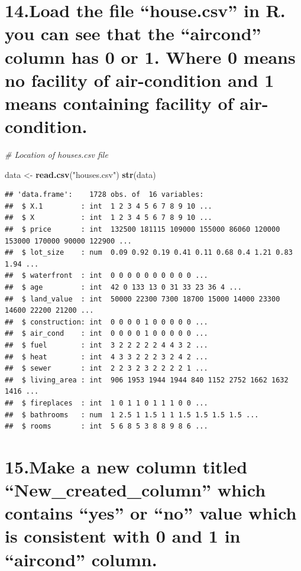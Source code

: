 \documentclass[]{article}
\newenvironment{Shaded}{\begin{snugshade}}{\end{snugshade}}
\newcommand{\CommentTok}[1]{\textcolor[rgb]{0.56,0.35,0.01}{\textit{#1}}}
\newcommand{\KeywordTok}[1]{\textcolor[rgb]{0.13,0.29,0.53}{\textbf{#1}}}
\newcommand{\NormalTok}[1]{#1}
\newcommand{\StringTok}[1]{\textcolor[rgb]{0.31,0.60,0.02}{#1}}
\begin{document}
\hypertarget{load-the-file-house.csv-in-r.-you-can-see-that-the-aircond-column-has-0-or-1.-where-0-means-no-facility-of-air-condition-and-1-means-containing-facility-of-air-condition.}{%
\section{14.Load the file ``house.csv'' in R. you can see that the
``aircond'' column has 0 or 1. Where 0 means no facility of
air-condition and 1 means containing facility of
air-condition.}\label{load-the-file-house.csv-in-r.-you-can-see-that-the-aircond-column-has-0-or-1.-where-0-means-no-facility-of-air-condition-and-1-means-containing-facility-of-air-condition.}}

\begin{Shaded}
\begin{Highlighting}[]
\CommentTok{# Location of houses.csv file}

\NormalTok{data <-}\StringTok{ }\KeywordTok{read.csv}\NormalTok{(}\StringTok{"houses.csv"}\NormalTok{)}
\KeywordTok{str}\NormalTok{(data)}
\end{Highlighting}
\end{Shaded}

\begin{verbatim}
## 'data.frame':    1728 obs. of  16 variables:
##  $ X.1         : int  1 2 3 4 5 6 7 8 9 10 ...
##  $ X           : int  1 2 3 4 5 6 7 8 9 10 ...
##  $ price       : int  132500 181115 109000 155000 86060 120000 153000 170000 90000 122900 ...
##  $ lot_size    : num  0.09 0.92 0.19 0.41 0.11 0.68 0.4 1.21 0.83 1.94 ...
##  $ waterfront  : int  0 0 0 0 0 0 0 0 0 0 ...
##  $ age         : int  42 0 133 13 0 31 33 23 36 4 ...
##  $ land_value  : int  50000 22300 7300 18700 15000 14000 23300 14600 22200 21200 ...
##  $ construction: int  0 0 0 0 1 0 0 0 0 0 ...
##  $ air_cond    : int  0 0 0 0 1 0 0 0 0 0 ...
##  $ fuel        : int  3 2 2 2 2 2 4 4 3 2 ...
##  $ heat        : int  4 3 3 2 2 2 3 2 4 2 ...
##  $ sewer       : int  2 2 3 2 3 2 2 2 2 1 ...
##  $ living_area : int  906 1953 1944 1944 840 1152 2752 1662 1632 1416 ...
##  $ fireplaces  : int  1 0 1 1 0 1 1 1 0 0 ...
##  $ bathrooms   : num  1 2.5 1 1.5 1 1 1.5 1.5 1.5 1.5 ...
##  $ rooms       : int  5 6 8 5 3 8 8 9 8 6 ...
\end{verbatim}

\hypertarget{make-a-new-column-titled-new_created_column-which-contains-yes-or-no-value-which-is-consistent-with-0-and-1-in-aircond-column.}{%
\section{15.Make a new column titled ``New\_created\_column'' which
contains ``yes'' or ``no'' value which is consistent with 0 and 1 in
``aircond''
column.}\label{make-a-new-column-titled-new_created_column-which-contains-yes-or-no-value-which-is-consistent-with-0-and-1-in-aircond-column.}}
\end{document}
